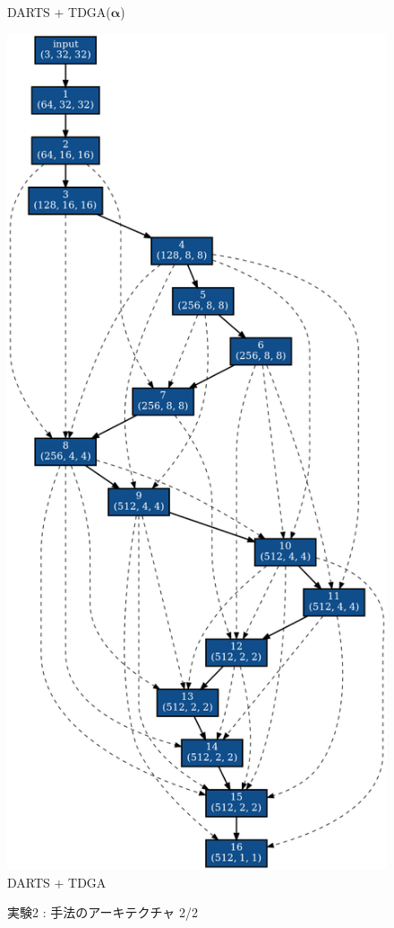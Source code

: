 \begin{figure}[tb]
\begin{minipage}{0.49\hsize}
\begin{center}
    DARTS + TDGA($\bm{\alpha}$)
 	\end{center}
 \end{minipage}
 \begin{minipage}{0.49\hsize}
 	\begin{center}
    \includegraphics[clip,scale=0.19]{./fig/04.exp/noevo_last.png}\\
    DARTS + TDGA
 	\end{center}
 \end{minipage}
 \caption{実験2 : 手法のアーキテクチャ 2/2}
 \label{fig:exp2/archi2}
\end{figure}

